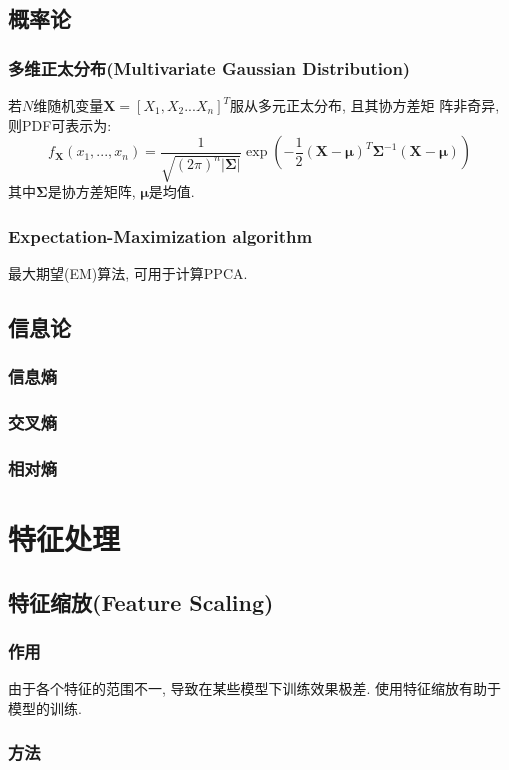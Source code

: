 \documentclass[oneside]{book}
\begin{document}
		\section{概率论}
			\subsection{多维正太分布(Multivariate Gaussian Distribution)}	
				若$N$维随机变量$\boldsymbol{X}= [X_{1}, X_{2} ... X_{n}]^{T}$服从多元正太分布, 且其协方差矩
				阵非奇异, 则PDF可表示为:				
				$$f_{\boldsymbol{X}}(x_{1}, ... , x_{n}) = \frac{1}{\sqrt{(2\pi)^{n}|\boldsymbol{\Sigma}|}}\exp{\left(-\frac{1}{2}(\boldsymbol{X}-\boldsymbol{\mu})^{T}\boldsymbol{\Sigma}^{-1}(\boldsymbol{X}-\boldsymbol{\mu})\right)}$$
				其中$\boldsymbol{\Sigma}$是协方差矩阵, $\boldsymbol{\mu}$是均值.
				\subsection{Expectation-Maximization algorithm}
				最大期望(EM)算法, 可用于计算PPCA.
		\section{信息论}
			\subsection{信息熵}
			\subsection{交叉熵}
			\subsection{相对熵}
	\setcounter{chapter}{0}
	\renewcommand{\thechapter}{\arabic{chapter}}
	\chapter{特征处理}
		\section{特征缩放(Feature Scaling)}
			\subsection{作用}
				由于各个特征的范围不一, 导致在某些模型下训练效果极差. 使用特征缩放有助于模型的训练.
			\subsection{方法}
\end{document}
